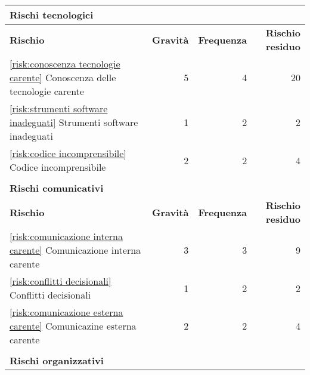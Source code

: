 \begin{table}[H]
	\centering

	\begin{tabular}{l|r|r|r}
		\multicolumn{4}{l}{\textbf{Rischi tecnologici}}                                                                                                         \\
		\hline
		\textbf{Rischio}                                                                     & \textbf{Gravità} & \textbf{Frequenza} & \textbf{Rischio residuo} \\
		\hline
		\autoref{risk:conoscenza tecnologie carente} Conoscenza delle tecnologie carente     & 5                & 4                  & 20                       \\
		\autoref{risk:strumenti software inadeguati} Strumenti software inadeguati           & 1                & 2                  & 2                        \\
		\autoref{risk:codice incomprensibile} Codice incomprensibile                         & 2                & 2                  & 4                        \\
		\hline
		\multicolumn{4}{l}{}                                                                                                                                    \\
		\multicolumn{4}{l}{\textbf{Rischi comunicativi}}                                                                                                        \\
		\hline
		\textbf{Rischio}                                                                     & \textbf{Gravità} & \textbf{Frequenza} & \textbf{Rischio residuo} \\
		\hline
		\autoref{risk:comunicazione interna carente} Comunicazione interna carente           & 3                & 3                  & 9                        \\
		\autoref{risk:conflitti decisionali} Conflitti decisionali                           & 1                & 2                  & 2                        \\
		\autoref{risk:comunicazione esterna carente} Comunicazine esterna carente            & 2                & 2                  & 4                        \\
		\hline
		\multicolumn{4}{l}{}                                                                                                                                    \\
		\multicolumn{4}{l}{\textbf{Rischi organizzativi}}                                                                                                       \\

\end{tabular}
\end{table}
